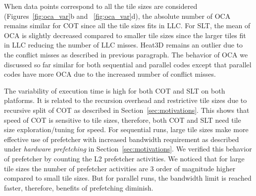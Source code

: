 

When data points correspond to all the tile sizes are considered
(Figures~\ref{fig:oca_var}b and ~\ref{fig:oca_var}d), the absolute number of
OCA remains similar for COT since all the tile sizes fits in LLC. For SLT, the
mean of OCA is slightly decreased compared to smaller tile sizes since the
larger tiles fit in LLC reducing the number of LLC misses. Heat3D remains an
outlier due to the conflict misses as described in previous paragraph. The
behavior of OCA we discussed so far similar for both sequential and parallel
codes except that parallel codes have more OCA due to the increased number of
conflict misses.



The variability of execution time is high for both COT and SLT on both
platforms. It is related to the recursion overhead and restrictive tile sizes
due to recursive split of COT as described in Section~\ref{sec:motivations}.
This shows that speed of COT is sensitive to tile sizes, therefore, both COT
and SLT need tile size exploration/tuning for speed. For sequential runs,
large tile sizes make more effective use of prefetcher with increased
bandwidth requirement as described under \emph{hardware prefetching} in
Section~\ref{sec:motivations}. We verified this behavior of prefetcher by
counting the L2 prefetcher activities. We noticed that for large tile sizes
the number of prefetcher activities are 3 order of magnitude higher compared
to small tile sizes.  But for parallel runs, the bandwidth limit is reached
faster, therefore, benefits of prefetching diminish.


